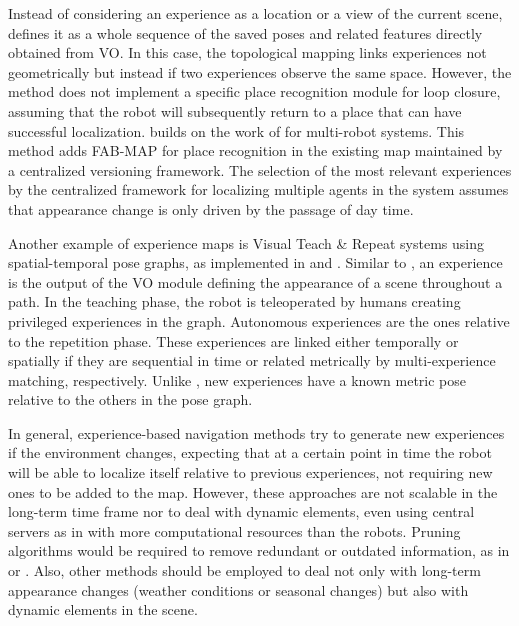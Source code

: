 Instead of considering an experience as a location or a view of the current scene, \cite{churchill-newman:2013:0278364913499193} defines it as a whole sequence of the saved poses and related features directly obtained from VO. In this case, the topological mapping links experiences not geometrically but instead if two experiences observe the same space. However, the method does not implement a specific place recognition module for loop closure, assuming that the robot will subsequently return to a place that can have successful localization.
\cite{gadd-newman:2016:7759843} builds on the work of \cite{churchill-newman:2013:0278364913499193} for multi-robot systems. This method adds FAB-MAP for place recognition in the existing map maintained by a centralized versioning framework. The selection of the most relevant experiences by the centralized framework for localizing multiple agents in the system assumes that appearance change is only driven by the passage of day time.

Another example of experience maps is Visual Teach \& Repeat systems using spatial-temporal pose graphs, as implemented in \cite{mactavish-et-al:2018:21838} and \cite{zhang-et-al:2018:8460674}.
Similar to \cite{churchill-newman:2013:0278364913499193}, an experience is the output of the VO module defining the appearance of a scene throughout a path. In the teaching phase, the robot is teleoperated by humans creating privileged experiences in the graph.
Autonomous experiences are the ones relative to the repetition phase. These experiences are linked either temporally or spatially if they are sequential in time or related metrically by multi-experience matching, respectively.
Unlike \cite{churchill-newman:2013:0278364913499193}, new experiences have a known metric pose relative to the others in the pose graph.

In general, experience-based navigation methods try to generate new experiences if the environment changes, expecting that at a certain point in time the robot will be able to localize itself relative to previous experiences, not requiring new ones to be added to the map.
However, these approaches are not scalable in the long-term time frame nor to deal with dynamic elements, even using central servers as in \cite{gadd-newman:2016:7759843} with more computational resources than the robots.
Pruning algorithms would be required to remove redundant or outdated information, as in \cite{konolige-bowman:2009:5354121} or \cite{tang-et-al:2019:7}.
Also, other methods should be employed to deal not only with long-term appearance changes (weather conditions or seasonal changes) but also with dynamic elements in the scene.



